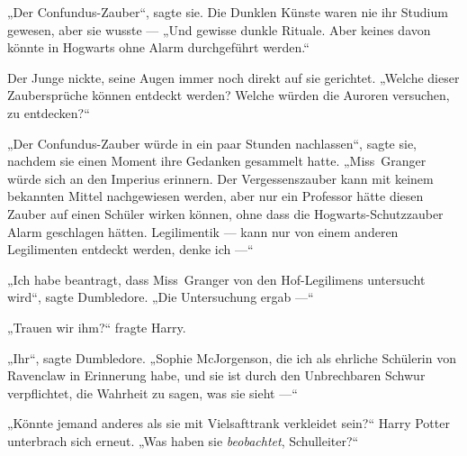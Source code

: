 „Der Confundus-Zauber“, sagte sie. Die Dunklen Künste waren nie ihr Studium gewesen, aber sie wusste —
„Und gewisse dunkle Rituale. Aber keines davon könnte in Hogwarts ohne Alarm durchgeführt werden.“

Der Junge nickte, seine Augen immer noch direkt auf sie gerichtet.
„Welche dieser Zaubersprüche können entdeckt werden? Welche würden die Auroren versuchen, zu entdecken?“

„Der Confundus-Zauber würde in ein paar Stunden nachlassen“, sagte sie, nachdem sie einen Moment ihre Gedanken gesammelt hatte.
„Miss~Granger würde sich an den Imperius erinnern. Der Vergessenszauber kann mit keinem bekannten Mittel nachgewiesen werden, aber nur ein Professor hätte diesen Zauber auf einen Schüler wirken können, ohne dass die Hogwarts-Schutzzauber Alarm geschlagen hätten. Legilimentik — kann nur von einem anderen Legilimenten entdeckt werden, denke ich —“

„Ich habe beantragt, dass Miss~Granger von den Hof-Legilimens untersucht wird“, sagte Dumbledore.
„Die Untersuchung ergab —“

„Trauen wir ihm?“ fragte Harry.

„Ihr“, sagte Dumbledore.
„Sophie McJorgenson, die ich als ehrliche Schülerin von Ravenclaw in Erinnerung habe, und sie ist durch den Unbrechbaren Schwur verpflichtet, die Wahrheit zu sagen, was sie sieht —“

„Könnte jemand anderes als sie mit Vielsafttrank verkleidet sein?“ Harry Potter unterbrach sich erneut.
„Was haben sie \emph{beobachtet}, Schulleiter?“

